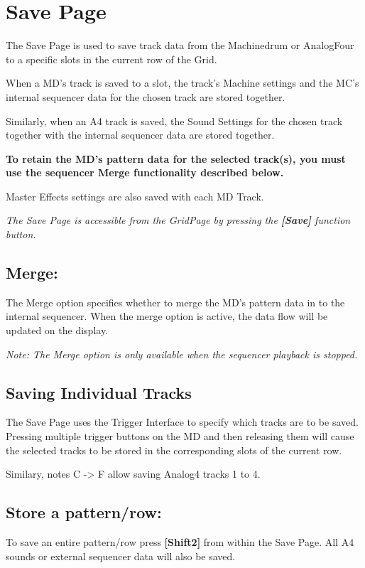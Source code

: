 \chapter{Save Page}

The Save Page is used to save track data from the Machinedrum or AnalogFour to a specific slots in the current row of the Grid.

When a MD's track is saved to a slot, the track's Machine settings and the MC's internal sequencer data for the chosen track are stored together.

Similarly, when an A4 track is saved, the Sound Settings for the chosen track together with the internal sequencer data are stored together.

\textbf{To retain the MD's pattern data for the selected track(s), you must use the sequencer Merge functionality described below.}

Master Effects settings are also saved with each MD Track.


\textit{The Save Page is accessible from the GridPage by pressing the  \textbf{[Save]} function button.}


\vspace{-0.5cm}

\section{Merge:}

\vspace{-0.5cm}


The Merge option specifies whether to merge the MD's pattern data in to the internal sequencer. When the merge option is active, the data flow will be updated on the display.

\textit{Note: The Merge option is only available when the sequencer playback is stopped.}

\section{Saving Individual Tracks}
The Save Page uses the Trigger Interface to specify which tracks are to be saved. Pressing multiple trigger buttons on the MD and then releasing them will cause the selected tracks to be stored in the corresponding slots of the current row.

Similary, notes C -> F allow saving Analog4 tracks 1 to 4.
\section{Store a pattern/row:}
To save an entire pattern/row press \textbf{[Shift2]} from within the Save Page. All A4 sounds or external sequencer data will also be saved.



